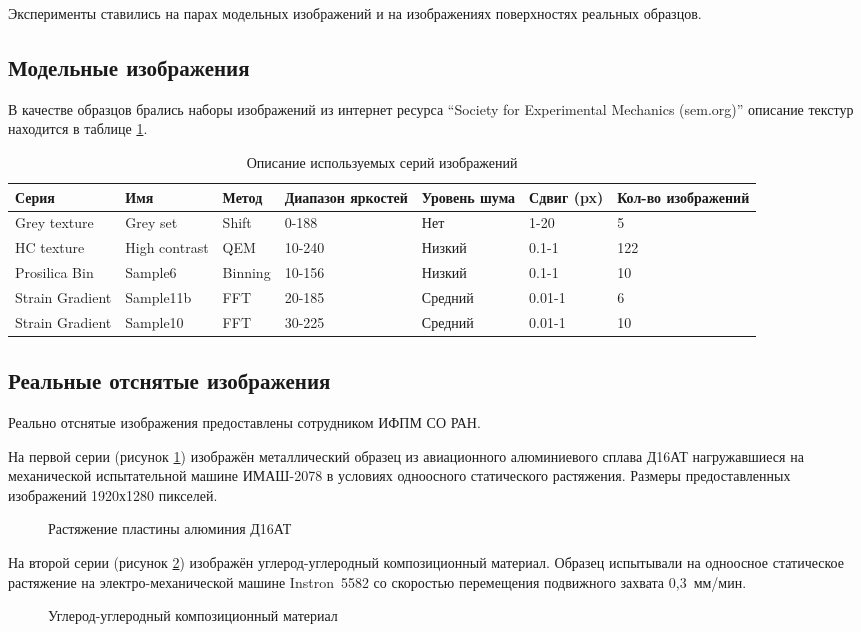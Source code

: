 Эксперименты ставились на парах модельных изображений и на изображениях поверхностях реальных образцов.
\subsection{Модельные изображения}

В качестве образцов брались наборы изображений из интернет ресурса ``Society for Experimental Mechanics (sem.org)'' описание текстур находится в таблице \ref{tab:set_image}.

\begin{longtable}[h!]{|*7{m{}|}}
\caption{Описание используемых серий изображений}
\label{tab:set_image}
\\ \hline
Серия & Имя & Метод & Диапазон яркостей 	& Уровень шума & Сдвиг (px) & Кол-во изображений \\ \hline
Grey texture & Grey set & Shift  & 0-188 & Нет & 1-20 & 5   \\ \hline
HC texture & High contrast & QEM & 10-240 & Низкий  & 0.1-1 & 122  \\ \hline
Prosilica Bin  & Sample6  & Binning & 10-156 & Низкий  & 0.1-1 & 10   \\ \hline
Strain Gradient & Sample11b & FFT & 20-185 	& Средний  & 0.01-1  & 6   \\ \hline
Strain Gradient & Sample10  & FFT & 30-225 	& Средний  & 0.01-1  & 10   \\ \hline
\end{longtable}

\subsection{Реальные отснятые изображения}

Реально отснятые изображения предоставлены сотрудником ИФПМ СО РАН. 

На первой серии (рисунок \ref{pic:al_deform}) изображён металлический образец из авиационного алюминиевого сплава Д16АТ нагружавшиеся на механической испытательной машине ИМАШ-2078 в условиях одноосного статического растяжения. Размеры предоставленных изображений 1920х1280 пикселей.
\begin{figure}[ht]
\caption{Растяжение пластины алюминия Д16АТ}
\label{pic:al_deform}
\end{figure}

На второй серии (рисунок \ref{pic:carbon_deform}) изображён углерод-углеродный композиционный материал. Образец испытывали на одноосное статическое растяжение на электро-механической машине Instron 5582 со скоростью перемещения подвижного захвата 0,3 мм/мин.
\begin{figure}[ht]
\caption{Углерод-углеродный композиционный материал}
\label{pic:carbon_deform}
\end{figure}

